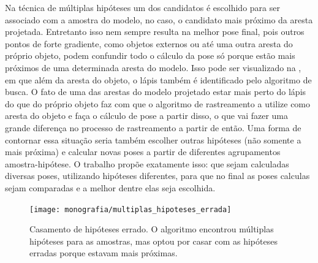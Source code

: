 Na técnica de múltiplas hipóteses um dos candidatos é escolhido para ser associado com a amostra do modelo, no caso, o candidato mais próximo da aresta projetada. Entretanto isso nem sempre resulta na melhor pose final, pois outros pontos de forte gradiente, como objetos externos ou até uma outra aresta do próprio objeto, podem confundir todo o cálculo da pose só porque estão mais próximos de uma determinada aresta do modelo. Isso pode ser visualizado na , em que além da aresta do objeto, o lápis também é identificado pelo algoritmo de busca. O fato de uma das arestas do modelo projetado estar mais perto do lápis do que do próprio objeto faz com que o algoritmo de rastreamento a utilize como aresta do objeto e faça o cálculo de pose a partir disso, o que vai fazer uma grande diferença no processo de rastreamento a partir de então. Uma forma de contornar essa situação seria também escolher outras hipóteses (não somente a mais próxima) e calcular novas poses a partir de diferentes agrupamentos amostra-hipótese. O trabalho \cite{celine} propõe exatamente isso: que sejam calculadas diversas poses, utilizando hipóteses diferentes, para que no final as poses calculas sejam comparadas e a melhor dentre elas seja escolhida.

\begin{figure}[!ht]
\centering\texttt{[image: monografia/multiplas\_hipoteses\_errada]}
\caption{Casamento de hipóteses errado. O algoritmo encontrou múltiplas hipóteses para as amostras, mas optou por casar com as hipóteses erradas porque estavam mais próximas.}
\label{multiplas_hipoteses_errada}
\end{figure}

